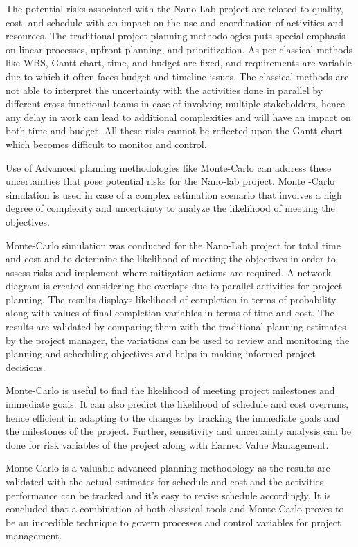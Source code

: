 \begin{SingleSpace}
The potential risks associated with the Nano-Lab project are related to quality, cost, and schedule with an impact on the use and coordination of activities and resources. The traditional project planning methodologies puts special emphasis on linear processes, upfront planning, and prioritization. As per classical methods like WBS, Gantt chart, time, and budget are fixed, and requirements are variable due to which it often faces budget and timeline issues. The classical methods are not able to interpret the uncertainty with the activities done in parallel by different cross-functional teams in case of involving multiple stakeholders, hence any delay in work can lead to additional complexities and will have an impact on both time and budget. All these risks cannot be reflected upon the Gantt chart which becomes difficult to monitor and control.



Use of Advanced planning methodologies like Monte-Carlo can address these uncertainties that pose potential risks for the Nano-lab project. Monte -Carlo simulation is used in case of a complex estimation scenario that involves a high degree of complexity and uncertainty to analyze the likelihood of meeting the objectives.

Monte-Carlo simulation was conducted for the Nano-Lab project for total time and cost and to determine the likelihood of meeting the objectives in order to assess risks and implement where mitigation actions are required. A network diagram is created considering the overlaps due to parallel activities for project planning. The results displays likelihood of completion in terms of probability along with values of final completion-variables in terms of time and cost. The results are validated by comparing them with the traditional planning estimates by the project manager, the variations can be used to review and monitoring the planning and scheduling objectives and helps in making informed project decisions.

Monte-Carlo is useful to find the likelihood of meeting project milestones and immediate goals. It can also predict the likelihood of schedule and cost overruns, hence efficient in adapting to the changes by tracking the immediate goals and the milestones of the project. Further, sensitivity and uncertainty analysis can be done for risk variables of the project along with Earned Value Management. 

Monte-Carlo is a valuable advanced planning methodology as the results are validated with the actual estimates for schedule and cost and the activities performance can be tracked and it's easy to revise schedule accordingly. It is concluded that a combination of both classical tools and Monte-Carlo proves to be an incredible technique to govern processes and control variables for project management.
 
\end{SingleSpace}
\clearpage